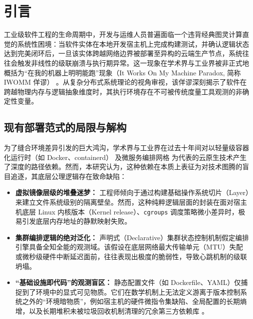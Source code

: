 \documentclass[journal]{IEEEtran}
\begin{document}
\IEEEpeerreviewmaketitle

\section{引言}

工业级软件工程的生命周期中，开发与运维人员普遍面临一个违背经典图灵计算直觉的系统性困境：当软件实体在本地开发宿主机上完成构建测试，并确认逻辑状态达到完美闭环后，一旦该实体跨越网络边界被部署至异构的云端生产节点，系统往往会触发非线性的级联崩溃与执行期异常。这一现象在学术界与工业界被非正式地概括为“在我的机器上明明能跑”现象（It Works On My Machine Paradox, 简称 IWOMM 佯谬） \cite{yin2011fixes}。从复杂分布式系统理论的视角审视，该佯谬深刻揭示了软件在跨越物理内存与逻辑抽象维度时，其执行环境存在不可被传统度量工具观测的非确定性变量。

\subsection{现有部署范式的局限与解构}
为了缝合环境差异引发的巨大鸿沟，学术界与工业界在过去十年间对以轻量级容器化运行时（如 Docker、containerd） \cite{merkel2014docker} 及微服务编排网格 \cite{balalaie2016microservices} 为代表的云原生技术产生了深度的路径依赖。然而，本研究认为，这种依赖在本质上表征为对技术图腾的盲目追逐，其底层公理逻辑存在致命缺陷：

\begin{itemize}
    \item \textbf{虚拟镜像层级的堆叠迷梦：} 工程师倾向于通过构建基础操作系统切片（Layer）来建立文件系统级别的隔离壁垒。然而，这种纯粹逻辑层面的封装在面对宿主机底层 Linux 内核版本（Kernel release）、\texttt{cgroups} 调度策略微小差异时，极易引发底层内存地址的静默映射失败。
    \item \textbf{集群编排逻辑的绝对泛化：} 声明式（Declarative）集群状态控制机制假定编排引擎具备全知全能的观测域。该假设在底层网络最大传输单元（MTU）失配或微秒级硬件中断延迟面前，往往表现出极度的脆弱性，导致心跳机制的级联坍塌。
    \item \textbf{“基础设施即代码”的观测盲区：} 静态配置文件（如 Dockerfile、YAML）仅捕捉到了环境中的显式可见物质。它们在数学机制上无法定义游离于版本控制系统之外的“环境暗物质”，例如宿主机的硬件微指令集缺陷、全局配置的长期熵增，以及长期堆积未被垃圾回收机制清理的冗余第三方依赖库 \cite{cito2017empirical}。
\end{itemize}
\end{document}
